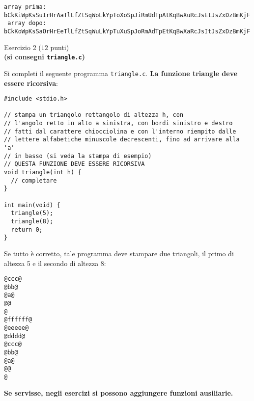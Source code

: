 \documentclass[12pt]{article}
\begin{document}
\begin{mdframed}[backgroundcolor=lightgrey] 
\begin{verbatim}
array prima: bCkKiWpKsSuIrHrAaTlLfZtSqWoLkYpToXoSpJiRmUdTpAtKqBwXuRcJsEtJsZxDzBmKjF
 array dopo: bCkKoWpKsSaOrHrEeTlLfZtSqWuLkYpTuXuSpJoRmAdTpEtKqBwXaRcJsItJsZxDzBmKjF
\end{verbatim}
\end{mdframed}

\begin{center}
  {\Large Esercizio 2} ($12$ punti)\\
  \textbf{(si consegni \texttt{triangle.c})}
\end{center}
%
Si completi il seguente programma \texttt{triangle.c}.
\textbf{La funzione triangle deve essere ricorsiva}:

\begin{center}
  \begin{lstlisting}[language=myC]
#include <stdio.h>

// stampa un triangolo rettangolo di altezza h, con
// l'angolo retto in alto a sinistra, con bordi sinistro e destro
// fatti dal carattere chiocciolina e con l'interno riempito dalle
// lettere alfabetiche minuscole decrescenti, fino ad arrivare alla 'a'
// in basso (si veda la stampa di esempio)
// QUESTA FUNZIONE DEVE ESSERE RICORSIVA
void triangle(int h) {
  // completare
}

int main(void) {
  triangle(5);
  triangle(8);
  return 0;
}
  \end{lstlisting}
\end{center}

Se tutto \`e corretto, tale programma deve stampare due triangoli, il
primo di altezza 5 e il secondo di altezza 8:

\begin{mdframed}[backgroundcolor=lightgrey] 
\begin{verbatim}
@ccc@
@bb@
@a@
@@
@
@ffffff@
@eeeee@
@dddd@
@ccc@
@bb@
@a@
@@
@
\end{verbatim}
\end{mdframed}

\begin{mdframed}[backgroundcolor=lightred] 
  \textbf{Se servisse, negli esercizi si possono aggiungere funzioni ausiliarie.}
\end{mdframed}
\end{document}
